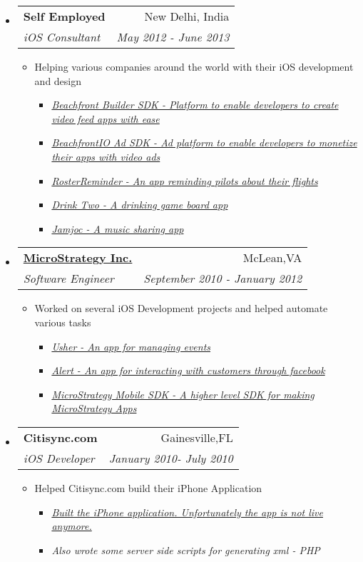 \documentclass[letterpaper,11pt]{article}
\makeatletter
\newcommand{\resitem}[1]{\item #1 \vspace{-2pt}}
\newcommand{\ressubheading}[4]{
\begin{tabular*}{7.0in}{l@{\extracolsep{\fill}}r}
    \textbf{#1} & #2 \\
    \textit{#3} & \textit{#4} \\
\end{tabular*}\vspace{-6pt}}
\makeatother
\begin{document}
\begin{itemize}
\item
    \ressubheading{{Self Employed}}{New Delhi, India}{iOS Consultant}{May 2012 - June 2013}
    \begin{itemize}
        \resitem{Helping various companies around the world with their iOS development and design}
        \begin{itemize}
           \resitem{\href{https://github.com/beachfront/videosdk-ios}{\emph{Beachfront Builder SDK - Platform to enable developers to create video feed apps with ease}}}
          \resitem{\href{https://github.com/beachfront/beachfront-io-ios-sdk}{\emph{BeachfrontIO Ad SDK - Ad platform to enable developers to monetize their apps with video ads}}}
           \resitem{\href{https://itunes.apple.com/us/app/sg-pilots-roster-reminder/id561001503}{\emph{RosterReminder - An app reminding pilots about their flights}}}
            \resitem{\href{https://itunes.apple.com/tr/app/drink-two-college-party-drinking/id590014833?mt=8}{\emph{Drink Two - A drinking game board app}}}
            \resitem{\href{https://itunes.apple.com/us/app/earhead/id585869906?mt=8}{\emph{Jamjoc - A music sharing app}}}
        \end{itemize}
    \end{itemize}

\item
    \ressubheading{\href{http://www.microstrategy.com/Company}{MicroStrategy Inc.}}{McLean,VA}{Software Engineer}{September 2010 - January 2012}
    \begin{itemize}
        \resitem{Worked on several iOS Development projects and helped automate various tasks}
        \begin{itemize}
            \resitem{\href{http://itunes.apple.com/us/app/usher-by-microstrategy/id477543403}{\emph{Usher - An app for managing events}}}
             \resitem{\href{http://itunes.apple.com/us/app/alert-for-iphone/id442981988?mt=8&ls=1}{\emph{Alert - An app for interacting with customers through facebook}}}
               \resitem{ \href{http://www.microstrategy.com/mobile/}{\emph{MicroStrategy Mobile SDK - A higher level SDK for making MicroStrategy Apps}}}
        \end{itemize}
    \end{itemize}

\item
    \ressubheading{Citisync.com}{Gainesville,FL}{iOS Developer}{January 2010- July 2010}
    \begin{itemize}
        \resitem{Helped Citisync.com build their iPhone Application}
        \begin{itemize}
            \resitem{\href{http://www.alligator.org/news/campus/article_8fe50876-c78b-11df-96a3-001cc4c03286.html}{\emph{Built the iPhone application. Unfortunately the app is not live anymore.}}}
           \resitem{\emph{Also wrote some server side scripts for generating xml - PHP}}
        \end{itemize}
    \end{itemize}


\end{itemize}
\end{document}
